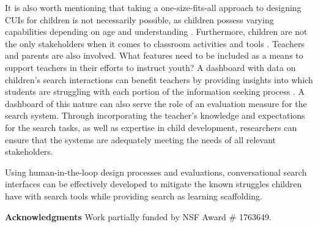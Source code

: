 \documentclass{sigchi-ext}
\begin{document}
It is also worth mentioning that taking a one-size-fits-all approach to designing CUIs for children is not necessarily possible, as children possess varying capabilities depending on age and understanding \cite{milton2021infinity}. Furthermore, children are not the only stakeholders when it comes to classroom activities and tools \cite{murgia2019will,murgia2019seven}. Teachers and parents are also involved. What features need to be included as a means to support teachers in their efforts to instruct youth? A dashboard with data on children's search interactions can benefit teachers by providing insights into which students are struggling with each portion of the information seeking process \cite{allen2021casting}. A dashboard of this nature can also serve the role of an evaluation measure for the search system. Through incorporating the teacher's knowledge and expectations for the search tasks, as well as expertise in child development, researchers can ensure that the systems are adequately meeting the needs of all relevant stakeholders.

Using human-in-the-loop design processes and evaluations, conversational search interfaces can be effectively developed to mitigate the known struggles children have with search tools while providing  search as learning scaffolding.

\textbf{Acknowledgments} Work partially funded by NSF Award \# 1763649.





\end{document}
